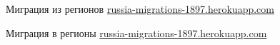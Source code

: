 \documentclass[aspectratio=169]{beamer}
\begin{document}
{
\begin{frame}[b]{Миграция из регионов}
\hfill \href{https://russia-migrations-1897.herokuapp.com}{russia-migrations-1897.herokuapp.com}
\bigskip
\end{frame}
}

{
\begin{frame}[b]{Миграция в регионы}
\hfill \href{https://russia-migrations-1897.herokuapp.com}{russia-migrations-1897.herokuapp.com}
\bigskip
\end{frame}
}
\end{document}
